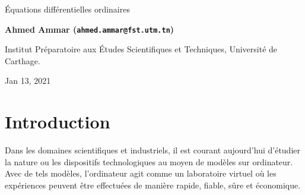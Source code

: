 \documentclass[%
oneside,                 %
final,                   %
10pt]{article}
\begin{document}

\newcommand{\exercisesection}[1]{\subsection*{#1}}






\thispagestyle{empty}

\begin{center}
{\LARGE\bf
\begin{spacing}{1.25}
Équations différentielles ordinaires
\end{spacing}
}
\end{center}


\begin{center}
{\bf Ahmed Ammar (\texttt{ahmed.ammar@fst.utm.tn})}
\end{center}

    \begin{center}
\centerline{{\small Institut Préparatoire aux Études Scientifiques et Techniques, Université de Carthage.}}
\end{center}
    

\begin{center}
Jan 13, 2021
\end{center}

\vspace{1cm}


\tableofcontents


\vspace{1cm} %




\section{Introduction}
Dans les domaines scientifiques et industriels, il est courant aujourd'hui d'étudier la nature ou les dispositifs technologiques au moyen de modèles sur ordinateur. Avec de tels modèles, l'ordinateur agit comme un laboratoire virtuel où les expériences peuvent être effectuées de manière rapide, fiable, sûre et économique.
\end{document}
